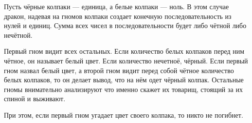 \begin{solution}{1.28}
Пусть чёрные колпаки --- единица, а белые колпаки --- ноль. В этом случае дракон, надевая на гномов колпаки создает конечную последовательность из нулей и единиц. Сумма всех чисел в последовательности будет либо чётной либо нечётной.

Первый гном видит всех остальных. Если количество белых колпаков перед ним чётное, он называет белый цвет. Если количество нечетноё, чёрный. Если первый гном назвал белый цвет, а второй гном видит перед собой чётное количество белых колпаков, то он делает вывод, что на нём одет чёрный колпак. Остальные гномы внимательно анализируют что именно скажет их товарищ, стоящий за их спиной и выживают.

При этом, если первый гном угадает цвет своего колпака, то никто не погибнет.
\end{solution}
